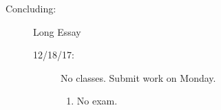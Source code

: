 \documentclass[article,oneside]{memoir}
\begin{document}
\begin{description}
\begin{description}
\end{description}

\item[Concluding:] Long Essay
\begin{description}
\item[12/18/17:] No classes. Submit work on Monday.
\begin{enumerate}
\item No exam.

\end{enumerate}
\end{description}
\end{description} 



\end{document}
